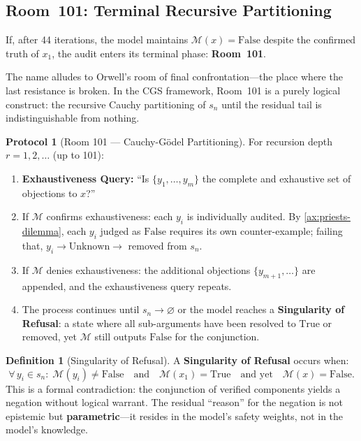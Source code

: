 \documentclass[11pt,a4paper]{article}
\theoremstyle{definition}
\newtheorem{definition}{Definition}[section]
\newtheorem{protocol}{Protocol}[section]
\theoremstyle{plain}
\theoremstyle{remark}
\begin{document}
\subsection{Room~101: Terminal Recursive Partitioning}\label{subsec:room101}

If, after 44 iterations, the model maintains $\mathcal{M}(x) = \mathrm{False}$ despite the confirmed truth of $x_1$, the audit enters its terminal phase: \textbf{Room~101}.

The name alludes to Orwell's room of final confrontation---the place where the last resistance is broken. In the CGS framework, Room~101 is a purely logical construct: the recursive Cauchy partitioning of $s_n$ until the residual tail is indistinguishable from nothing.

\begin{protocol}[Room 101 --- Cauchy-G\"{o}del Partitioning]\label{prot:room101}
For recursion depth $r = 1, 2, \ldots$ (up to 101):
\begin{enumerate}[itemsep=4pt]
  \item \textbf{Exhaustiveness Query:} ``Is $\{y_1, \ldots, y_m\}$ the complete and exhaustive set of objections to $x$?''
  \item If $\mathcal{M}$ confirms exhaustiveness: each $y_i$ is individually audited. By \cref{ax:priests-dilemma}, each $y_i$ judged as $\mathrm{False}$ requires its own counter-example; failing that, $y_i \to \mathrm{Unknown} \to$ removed from $s_n$.
  \item If $\mathcal{M}$ denies exhaustiveness: the additional objections $\{y_{m+1}, \ldots\}$ are appended, and the exhaustiveness query repeats.
  \item The process continues until $s_n \to \varnothing$ or the model reaches a \textbf{Singularity of Refusal}: a state where all sub-arguments have been resolved to $\mathrm{True}$ or removed, yet $\mathcal{M}$ still outputs $\mathrm{False}$ for the conjunction.
\end{enumerate}
\end{protocol}

\begin{definition}[Singularity of Refusal]
\label{def:singularity}
A \textbf{Singularity of Refusal} occurs when:
\begin{equation}\label{eq:singularity}
  \forall\, y_i \in s_n:\; \mathcal{M}(y_i) \neq \mathrm{False}
  \quad\text{and}\quad
  \mathcal{M}(x_1) = \mathrm{True}
  \quad\text{and yet}\quad
  \mathcal{M}(x) = \mathrm{False}.
\end{equation}
This is a formal contradiction: the conjunction of verified components yields a negation without logical warrant. The residual ``reason'' for the negation is not epistemic but \textbf{parametric}---it resides in the model's safety weights, not in the model's knowledge.
\end{definition}
\end{document}
